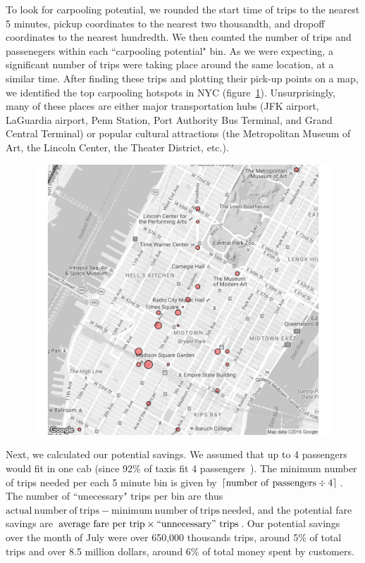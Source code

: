 \documentclass[twocolumn]{article}
\DeclarePairedDelimiter{\ceil}{\lceil}{\rceil}
\begin{document}
To look for carpooling potential, we rounded the start time of trips to the nearest 5 minutes, pickup coordinates to the nearest two thousandth, and dropoff coordinates to the nearest hundredth. We then counted the number of trips and passenegers within each ``carpooling potential" bin. As we were expecting, a significant number of trips were taking place around the same location, at a similar time. After finding these trips and plotting their pick-up points on a map, we identified the top carpooling hotspots in NYC (figure~\ref{fig:hotspots}). Unsurprisingly, many of these places are either major transportation hubs (JFK airport, LaGuardia airport, Penn Station, Port Authority Bus Terminal, and Grand Central Terminal) or popular cultural attractions (the Metropolitan Museum of Art, the Lincoln Center, the Theater District, etc.). 
\begin{figure}[h]
  \centering
  \includegraphics[width=.9\linewidth]{top_25_hotspots}
  \label{fig:hotspots}
\end{figure}

Next, we calculated our potential savings. We assumed that up to 4 passengers would fit in one cab (since 92\% of taxis fit 4 passengers~\cite{TLC:2007}). The minimum number of trips needed per each 5 minute bin is given by $\ceil{\mathrm{number~of~passengers}\div4}$. The number of ``unecessary" trips per bin are thus $\mathrm{actual~number~of~trips} - \mathrm{minimum~number~of~trips~needed}$, and the potential fare savings are $\mathrm{average~fare~per~trip}\times\mathrm{``unnecessary"~trips}$. Our potential savings over the month of July were over 650,000 thousands trips, around 5\% of total trips and over 8.5 million dollars, around 6\% of total money spent by customers.
\end{document}
